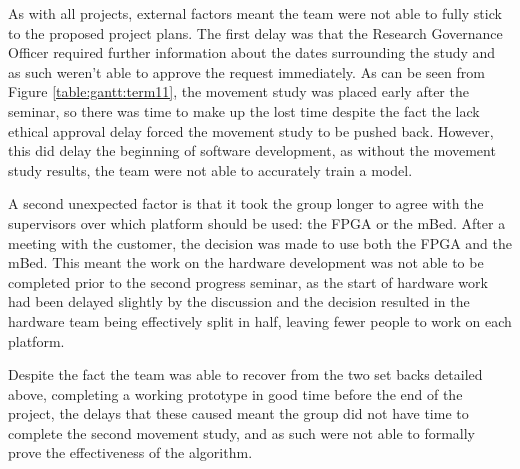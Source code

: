 As with all projects, external factors meant the team were not able to fully stick to the proposed project plans. The first delay was that the Research Governance Officer required further information about the dates surrounding the study and as such weren't able to approve the request immediately. As can be seen from Figure \ref{table:gantt:term11}, the movement study was placed early after the seminar, so there was time to make up the lost time despite the fact the lack ethical approval delay forced the movement study to be pushed back. However, this did delay the beginning of software development, as without the movement study results, the team were not able to accurately train a model.

A second unexpected factor is that it took the group longer to agree with the supervisors over which platform should be used: the FPGA or the mBed. After a meeting with the customer, the decision was made to use both the FPGA and the mBed. This meant the work on the hardware development was not able to be completed prior to the second progress seminar, as the start of hardware work had been delayed slightly by the discussion and the decision resulted in the hardware team being effectively split in half, leaving fewer people to work on each platform.

Despite the fact the team was able to recover from the two set backs detailed above, completing a working prototype in good time before the end of the project, the delays that these caused meant the group did not have time to complete the second movement study, and as such were not able to formally prove the effectiveness of the algorithm.